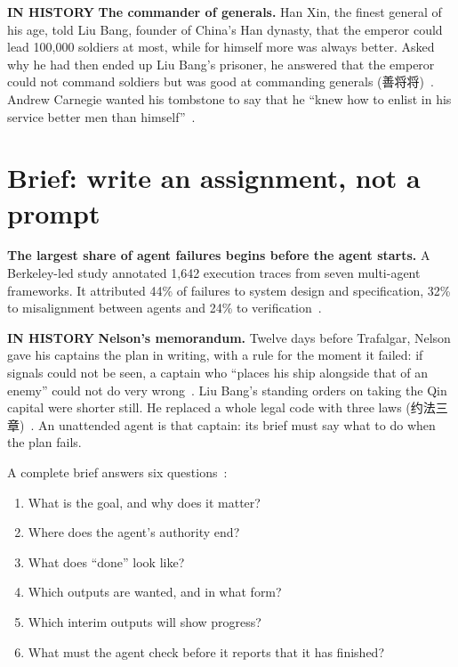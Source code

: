 \documentclass[11pt,letterpaper]{article}
\newcommand{\takeaway}[1]{\textbf{#1}}
\newcommand{\zh}[1]{{\zhfont #1}}
\newcommand{\histlabel}[1]{{\sffamily\fontsize{7.6}{9.6}\selectfont\bfseries\color{muted}IN HISTORY}%
  \enspace\textbf{#1}\enspace}
\begin{document}
\begin{history}
\histlabel{The commander of generals.} Han Xin, the finest general of his age, told Liu Bang,
founder of China's Han dynasty, that the emperor could lead 100,000 soldiers at most, while
for himself more was always better. Asked why he had then ended up Liu Bang's prisoner, he
answered that the emperor could not command soldiers but was good at commanding generals
(\zh{善将将})~\cite{shiji}. Andrew Carnegie wanted his tombstone to say that he ``knew how to
enlist in his service better men than himself''~\cite{carnegie}.
\end{history}

\section{Brief: write an assignment, not a prompt}\label{sec:brief}

\takeaway{The largest share of agent failures begins before the agent starts.} A Berkeley-led study annotated
1,642 execution traces from seven multi-agent frameworks. It attributed 44\% of failures to
system design and specification, 32\% to misalignment between agents and 24\% to
verification~\cite{mast}.

\begin{history}
\histlabel{Nelson's memorandum.} Twelve days before Trafalgar, Nelson gave his captains the
plan in writing, with a rule for the moment it failed: if signals could not be seen, a
captain who ``places his ship alongside that of an enemy'' could not do very
wrong~\cite{nelson}. Liu Bang's standing orders on taking the Qin capital were shorter still.
He replaced a whole legal code with three laws (\zh{约法三章})~\cite{shiji}. An unattended
agent is that captain: its brief must say what to do when the plan fails.
\end{history}

\enlargethispage{1.3\baselineskip}
A complete brief answers six questions~\cite{mollick}:

\begin{enumerate}[leftmargin=1.5em, itemsep=0.05em]
  \item What is the goal, and why does it matter?
  \item Where does the agent's authority end?
  \item What does ``done'' look like?
  \item Which outputs are wanted, and in what form?
  \item Which interim outputs will show progress?
  \item What must the agent check before it reports that it has finished?
\end{enumerate}
\end{document}
